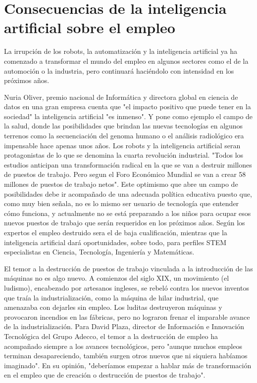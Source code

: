 \documentclass[12pt,a4paper]{article}
\begin{document}
\section{Consecuencias de la inteligencia artificial sobre el empleo}

La irrupción de los robots, la automatización y la inteligencia artificial ya ha comenzado a transformar el mundo del empleo en algunos sectores como el de la automoción o la industria, pero continuará haciéndolo con intensidad en los próximos años.

Nuria Oliver, premio nacional de Informática y directora global en ciencia de datos en una gran empresa cuenta que "el impacto positivo que puede tener en la sociedad" la inteligencia artificial "es inmenso". Y pone como ejemplo el campo de la salud, donde las posibilidades que brindan las nuevas tecnologías en algunos terrenos como la secuenciación del genoma humano o el análisis radiológico era impensable hace apenas unos años. Los robots y la inteligencia artificial seran protagonistas de lo que se denomina la cuarta revolución industrial. "Todos los estudios anticipan una transformación radical en la que se van a destruir millones de puestos de trabajo. Pero segun el Foro Económico Mundial se van a crear 58 millones de puestos de trabajo netos". Este optimismo que abre un campo de posibilidades debe ir acompañado de una adecuada política educativa puesto que, como muy bien señala, no es lo mismo ser usuario de tecnología que entender cómo funciona, y actualmente no se está preparando a los niños para ocupar esos nuevos puestos de trabajo que serán requeridos en los próximos años. Según los expertos el empleo destruido sera el de baja cualificación, mientras que la inteligencia artificial dará oportunidades, sobre todo, para perfiles STEM especialistas en Ciencia, Tecnología, Ingeniería y Matemáticas.

El temor a la destrucción de puestos de trabajo vinculada a la introducción de las máquinas no es algo nuevo. A comienzos del siglo XIX, un movimiento (el ludismo), encabezado por artesanos ingleses, se rebeló contra los nuevos inventos que traía la industrialización, como la máquina de hilar industrial, que amenazaba con dejarles sin empleo. Los luditas destruyeron máquinas y provocaron incendios en las fábricas, pero no lograron frenar el imparable avance de la industrialización. Para David Plaza, director de Información e Innovación Tecnológica del Grupo Adecco, el temor a la destrucción de empleo ha acompañado siempre a los avances tecnológicos, pero "aunque muchos empleos terminan desapareciendo, también surgen otros nuevos que ni siquiera habíamos imaginado". En su opinión, "deberíamos empezar a hablar más de transformación en el empleo que de creación o destrucción de puestos de trabajo".
\end{document}
